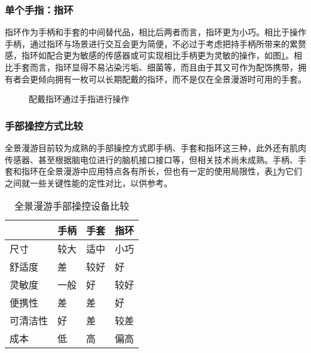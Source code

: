 \subsubsection{单个手指：指环}
指环作为手柄和手套的中间替代品，相比后两者而言，指环更为小巧。相比于操作手柄，通过指环与场景进行交互会更为简便，不必过于考虑把持手柄所带来的累赘感，指环如配合更为敏感的传感器或可实现相比手柄更为灵敏的操作，如图\ref{fig:ring}。相比手套而言，指环显得不易沾染污垢、细菌等，而且由于其又可作为配饰携带，拥有者会更倾向拥有一枚可以长期配戴的指环，而不是仅在全景漫游时可用的手套。


\begin{figure}[htp]
\centering
{}
\caption{配戴指环通过手指进行操作}
\label{fig:ring}
\end{figure}

\subsubsection{手部操控方式比较}
全景漫游目前较为成熟的手部操控方式即手柄、手套和指环这三种，此外还有肌肉传感器、甚至根据脑电位进行的脑机接口接口等，但相关技术尚未成熟。手柄、手套和指环在全景漫游中应用特点各有所长，但也有一定的使用局限性，表\ref{tab:hand}为它们之间就一些关键性能的定性对比，以供参考。

\begin{table}[htbp]
\centering
\caption{全景漫游手部操控设备比较}
\vskip 5pt
\begin{tabular}{llll}
\toprule
 & 手柄 & 手套 & 指环 \\
\midrule
尺寸 & 较大 & 适中 & 小巧 \\
舒适度 & 差 & 较好 & 好 \\
灵敏度 & 一般 & 好 & 较好 \\
便携性 & 差 & 差 & 好 \\
可清洁性 & 好 & 差 & 较差 \\
成本 & 低 & 高 & 偏高 \\
\bottomrule
\end{tabular}
\label{tab:hand}
\end{table}

